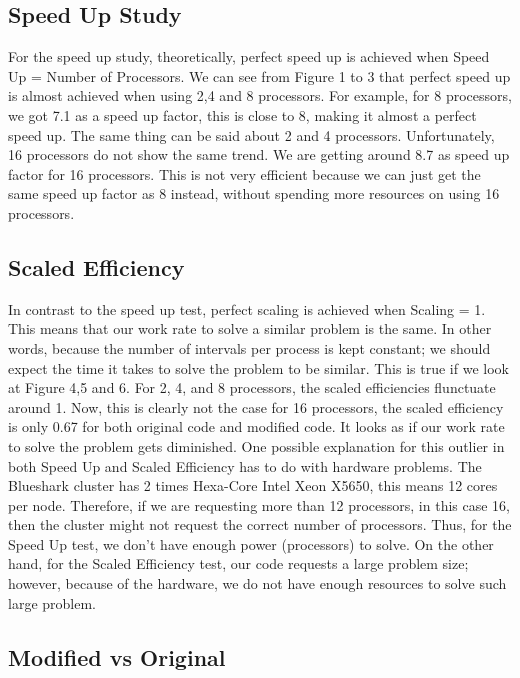 \documentclass[12pt]{article}
\begin{document}
	\subsection{Speed Up Study}
	For the speed up study, theoretically, perfect speed up is achieved when Speed Up = Number of Processors. We can see from Figure 1 to 3 that perfect speed up is almost achieved when using 2,4 and 8 processors. For example, for 8 processors, we got 7.1 as a speed up factor, this is close to 8, making it almost a perfect speed up.  The same thing can be said about 2 and 4 processors.  Unfortunately, 16 processors do not show the same trend. We are getting around 8.7 as speed up factor for 16 processors.  This is not very efficient because we can just get the same speed up factor as 8 instead, without spending more resources on using 16 processors. 

	\subsection{Scaled Efficiency}
	In contrast to the speed up test, perfect scaling is achieved when Scaling = 1.  This means that our work rate to solve a similar problem is the same.  In other words, because the number of intervals per process is kept constant; we should expect the time it takes to solve the problem to be similar. This is true if we look at Figure 4,5 and 6. For 2, 4, and 8 processors, the scaled efficiencies flunctuate around 1. Now, this is clearly not the case for 16 processors, the scaled efficiency is only 0.67 for both original code and modified code. It looks as if our work rate to solve the problem gets diminished. One possible explanation for this outlier in both Speed Up and Scaled Efficiency has to do with hardware problems. The Blueshark cluster has 2  times Hexa-Core Intel Xeon X5650, this means 12 cores per node. Therefore, if we are requesting more than 12 processors, in this case 16, then the cluster might not request the correct number of processors. Thus, for the Speed Up test, we don't have enough power (processors) to solve. On the other hand, for the Scaled Efficiency test, our code requests a large problem size; however, because of the hardware, we do not have enough resources to solve such large problem. 

	\subsection{Modified vs Original}
\end{document}
